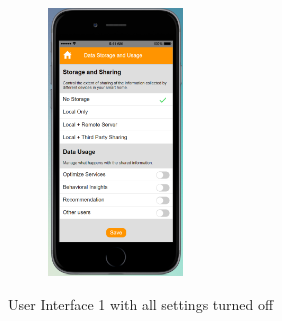 \begin{appendices}
\begin{figure}
\begin{subfigure}[t]{0.24\textwidth}
	\end{subfigure}%
	~
	\begin{subfigure}[t]{0.24\textwidth}
		\centering
		\includegraphics[height=2.8in]{figures/ui1allOff4.png}
	\end{subfigure}%
	\caption{User Interface 1 with all settings turned off}
	\label{fig:ui1AllOff}
\end{figure}


\end{appendices}
